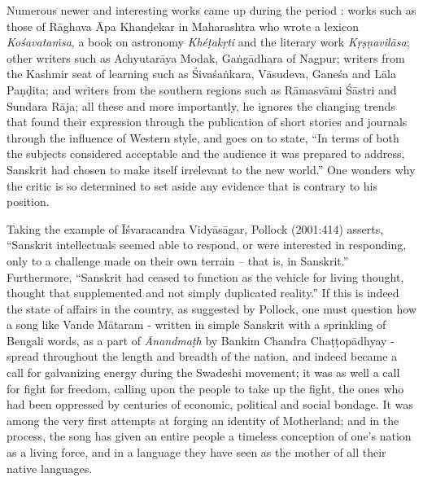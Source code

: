 Numerous newer and interesting works came up during the period : works such as those of Rāghava Āpa Khanḍekar in Maharashtra who wrote  a lexicon {\sl Kośavataṁsa}, a book on astronomy {\sl Khéṭakṛti} and the literary work {\sl Kṛṣṇavilāsa}; other writers such as Achyutarāya Modak, Gaṅgādhara of Nagpur; writers from the Kashmir seat of learning such as Śivaśaṅkara, Vāsudeva, Ganeśa and Lāla Paṇḍita; and writers from the southern regions such as Rāmasvāmi Śāstri and  Sundara Rāja; all these and more importantly, he ignores the changing trends that found their expression through the publication of short stories and journals through the influence of Western style, and goes on to state, “In terms of both the subjects considered acceptable and the audience it was prepared to address, Sanskrit had chosen to make itself irrelevant to the new world.” One wonders why the critic is so determined to set aside any evidence that is contrary to his position.

Taking the example of Īśvaracandra Vidyāsāgar, Pollock (2001:414) asserts, “Sanskrit intellectuals seemed able to respond, or were interested in responding, only to a challenge made on their own terrain – that is, in Sanskrit.” Furthermore, “Sanskrit had ceased to function as the vehicle for living thought, thought that supplemented and not simply duplicated reality.” If this is indeed the state of affairs in the country, as suggested by Pollock, one must question how a song like Vande Mātaram - written in simple Sanskrit with a sprinkling of Bengali words, as a part of {\sl Ānandmaṭh} by Bankim Chandra Chaṭṭopādhyay - spread throughout the length and breadth of the nation, and indeed became a call for galvanizing energy during the Swadeshi movement; it was as well a call for fight for freedom, calling upon the people to take up the fight, the ones who had been oppressed by centuries of economic, political and social bondage. It was among the very first attempts at forging an identity of Motherland; and in the process, the song has given an entire people a timeless conception of one’s nation as a living force, and in a language they have seen as the mother of all their native languages. 

